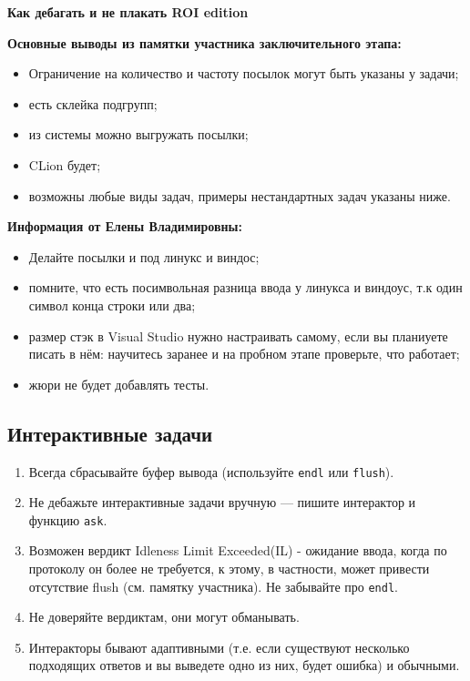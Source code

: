 \documentclass[12pt,a4paper]{article}
\begin{document}
\begin{center}
\Large\textbf{Как дебагать и не плакать ROI edition}
\end{center}

\textbf{Основные выводы из памятки участника заключительного этапа:}

\begin{itemize}
\item Ограничение на количество и частоту посылок могут быть указаны у задачи;
\item есть склейка подгрупп;
\item из системы можно выгружать посылки;
\item CLion будет;
\item возможны любые виды задач, примеры нестандартных задач указаны ниже.
\end{itemize}

\textbf{Информация от Елены Владимировны:}

\begin{itemize}
\item Делайте посылки и под линукс и виндос;
\item помните, что есть посимвольная разница ввода у линукса и виндоус, т.к один символ конца строки или два;
\item размер стэк в Visual Studio нужно настраивать самому, если вы планиуете писать в нём: научитесь заранее и на пробном этапе проверьте, что работает;
\item жюри не будет добавлять тесты.
\end{itemize}

\subsection*{Интерактивные задачи}

\begin{enumerate}
    \item Всегда сбрасывайте буфер вывода (используйте \texttt{endl} или \texttt{flush}).
    \item Не дебажьте интерактивные задачи вручную — пишите интерактор и функцию \texttt{ask}.
    \item Возможен вердикт Idleness Limit Exceeded(IL) - ожидание ввода, когда по протоколу он более не требуется, к этому, в частности, может привести отсутствие flush (см. памятку участника). Не забывайте про \texttt{endl}.
    \item Не доверяйте вердиктам, они могут обманывать.
    \item Интеракторы бывают адаптивными (т.е. если существуют несколько подходящих ответов и вы выведете одно из них, будет ошибка) и обычными.
\end{enumerate}
\end{document}
